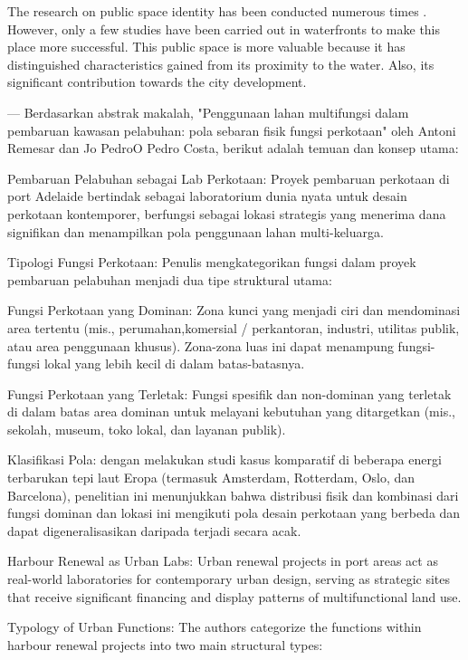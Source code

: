 \documentclass[../riset_senja.tex]{subfiles}
\begin{document}
The research on public space identity has been conducted numerous times \citep{oktay2015}. However, only a few studies have been carried out in waterfronts to make this place more successful.
This public space is more valuable because it has distinguished characteristics gained from its proximity to the water. Also, its significant contribution towards the city development.


---
Berdasarkan abstrak makalah, "Penggunaan lahan multifungsi dalam pembaruan kawasan pelabuhan: pola sebaran fisik fungsi perkotaan" oleh Antoni Remesar dan Jo PedroO Pedro Costa, berikut adalah temuan dan konsep utama:

Pembaruan Pelabuhan sebagai Lab Perkotaan: Proyek pembaruan perkotaan di port Adelaide bertindak sebagai laboratorium dunia nyata untuk desain perkotaan kontemporer, berfungsi sebagai lokasi strategis yang menerima dana signifikan dan menampilkan pola penggunaan lahan multi-keluarga.

Tipologi Fungsi Perkotaan: Penulis mengkategorikan fungsi dalam proyek pembaruan pelabuhan menjadi dua tipe struktural utama:

Fungsi Perkotaan yang Dominan: Zona kunci yang menjadi ciri dan mendominasi area tertentu (mis., perumahan,komersial / perkantoran, industri, utilitas publik, atau area penggunaan khusus). Zona-zona luas ini dapat menampung fungsi-fungsi lokal yang lebih kecil di dalam batas-batasnya.

Fungsi Perkotaan yang Terletak: Fungsi spesifik dan non-dominan yang terletak di dalam batas area dominan untuk melayani kebutuhan yang ditargetkan (mis., sekolah, museum, toko lokal, dan layanan publik).

Klasifikasi Pola: dengan melakukan studi kasus komparatif di beberapa energi terbarukan tepi laut Eropa (termasuk Amsterdam, Rotterdam, Oslo, dan Barcelona), penelitian ini menunjukkan bahwa distribusi fisik dan kombinasi dari fungsi dominan dan lokasi ini mengikuti pola desain perkotaan yang berbeda dan dapat digeneralisasikan daripada terjadi secara acak.


Harbour Renewal as Urban Labs: Urban renewal projects in port areas act as real-world laboratories for contemporary urban design, serving as strategic sites that receive significant financing and display patterns of multifunctional land use.

Typology of Urban Functions: The authors categorize the functions within harbour renewal projects into two main structural types:
\end{document}
